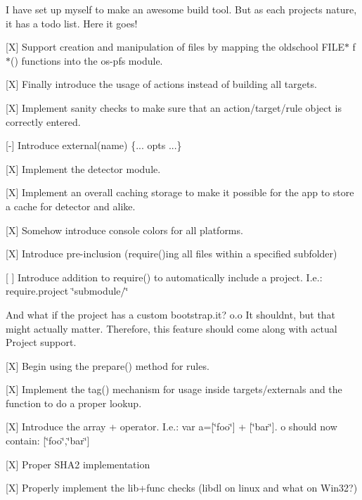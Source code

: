 I have set up myself to make an awesome build tool. But as each project\textquotesingle{}s nature, it has a todo list. Here it goes!


\begin{DoxyItemize}
\item \mbox{[}X\mbox{]} Support creation and manipulation of files by mapping the oldschool {\ttfamily F\+I\+L\+E$\ast$ f$\ast$()} functions into the {\ttfamily os-\/pfs} module.
\item \mbox{[}X\mbox{]} Finally introduce the usage of actions instead of building all targets.
\item \mbox{[}X\mbox{]} Implement sanity checks to make sure that an action/target/rule object is correctly entered.
\item \mbox{[}-\/\mbox{]} Introduce {\ttfamily external(name) \{... opts ...\}}
\item \mbox{[}X\mbox{]} Implement the detector module.
\item \mbox{[}X\mbox{]} Implement an overall caching storage to make it possible for the app to store a cache for detector and alike.
\item \mbox{[}X\mbox{]} Somehow introduce console colors for all platforms.
\item \mbox{[}X\mbox{]} Introduce pre-\/inclusion ({\ttfamily require()}ing all files within a specified subfolder)
\item \mbox{[} \mbox{]} Introduce addition to {\ttfamily require()} to automatically include a project. I.\+e.\+: {\ttfamily require.\+project \char`\"{}submodule/\char`\"{}}
\begin{DoxyItemize}
\item And what if the project has a custom {\ttfamily bootstrap.\+it}? o.\+o It shouldn\textquotesingle{}t, but that might actually matter. Therefore, this feature should come along with actual Project support.
\end{DoxyItemize}
\item \mbox{[}X\mbox{]} Begin using the {\ttfamily prepare()} method for rules.
\item \mbox{[}X\mbox{]} Implement the {\ttfamily tag()} mechanism for usage inside targets/externals and the function to do a proper lookup.
\item \mbox{[}X\mbox{]} Introduce the array {\ttfamily +} operator. I.\+e.\+: {\ttfamily var a=\mbox{[}\char`\"{}foo\char`\"{}\mbox{]} + \mbox{[}\char`\"{}bar\char`\"{}\mbox{]}}. {\ttfamily o} should now contain\+: {\ttfamily \mbox{[}\char`\"{}foo\char`\"{},\char`\"{}bar\char`\"{}\mbox{]}}
\item \mbox{[}X\mbox{]} Proper S\+H\+A2 implementation
\item \mbox{[}X\mbox{]} Properly implement the lib+func checks (libdl on linux and what on Win32?)
\end{DoxyItemize}

